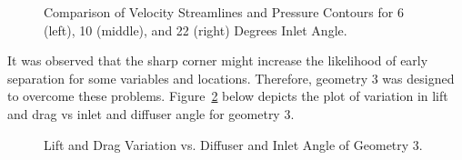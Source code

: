 \begin{figure}[!hb]
   \noindent{}
   \caption{Comparison of Velocity Streamlines and Pressure Contours for 6 (left), 10 (middle), and 22 (right) Degrees Inlet Angle.}
   \label{fig:A1_Contour_inlet_compare}
\end{figure}

\noindent It was observed that the sharp corner might increase the likelihood of early separation for some variables and locations. Therefore, geometry 3 was designed to overcome these problems. Figure~\ref{fig:2D_OF_A4_results} below depicts the plot of variation in lift and drag vs inlet and diffuser angle for geometry 3.

\begin{figure}[!ht]
    \noindent{}
    \caption{Lift and Drag Variation vs. Diffuser and Inlet Angle of Geometry 3.}
    \label{fig:2D_OF_A4_results}
\end{figure}

